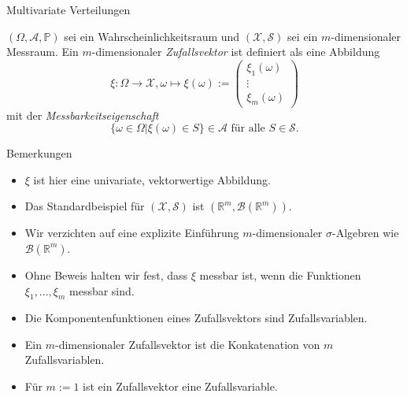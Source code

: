 \documentclass[
  8pt,
  ignorenonframetext,
]{beamer}
\providecommand{\tightlist}{%
  \setlength{\itemsep}{0pt}\setlength{\parskip}{0pt}}
\begin{document}
\begin{frame}{Multivariate Verteilungen}
\protect\hypertarget{multivariate-verteilungen-1}{}
\footnotesize
\begin{definition}[Zufallsvektor]
\justifying
$(\Omega, \mathcal{A}, \mathbb{P})$ sei ein Wahrscheinlichkeitsraum und
$(\mathcal{X},\mathcal{S})$ sei ein $m$-dimensionaler Messraum.
Ein $m$-dimensionaler \textit{Zufallsvektor} ist definiert als eine Abbildung
\begin{equation}
\xi:\Omega \to \mathcal{X}, \omega \mapsto \xi(\omega) :=
\begin{pmatrix}
\xi_1(\omega) \\
\vdots      \\
\xi_m(\omega)
\end{pmatrix}
\end{equation}
mit der \textit{Messbarkeitseigenschaft}
\begin{equation}
\{\omega \in \Omega|\xi(\omega) \in S \} \in \mathcal{A} \mbox{ für alle } S \in \mathcal{S}.
\end{equation}
\end{definition}
\vspace{-2mm}
\footnotesize

Bemerkungen \vspace{-2mm}

\begin{itemize}
\tightlist
\item
  \(\xi\) ist hier eine univariate, vektorwertige Abbildung.
\item
  Das Standardbeispiel für \((\mathcal{X},\mathcal{S})\) ist
  \((\mathbb{R}^m, \mathcal{B}(\mathbb{R}^m))\).
\item
  Wir verzichten auf eine explizite Einführung \(m\)-dimensionaler
  \(\sigma\)-Algebren wie \(\mathcal{B}(\mathbb{R}^m)\).
\item
  Ohne Beweis halten wir fest, dass \(\xi\) messbar ist, wenn die
  Funktionen \(\xi_1,...,\xi_m\) messbar sind.
\item
  Die Komponentenfunktionen eines Zufallsvektors sind Zufallsvariablen.
\item
  Ein \(m\)-dimensionaler Zufallsvektor ist die Konkatenation von \(m\)
  Zufallsvariablen.
\item
  Für \(m := 1\) ist ein Zufallsvektor eine Zufallsvariable.
\end{itemize}
\end{frame}
\end{document}
